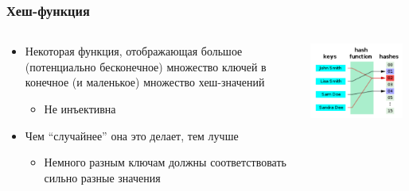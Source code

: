 \documentclass{../../slides-style}
\begin{document}
    \begin{frame}
        \frametitle{Хеш-функция}
        \begin{columns}
            \begin{column}{0.75\textwidth}
                \begin{itemize}
                    \item Некоторая функция, отображающая большое (потенциально бесконечное) множество ключей в конечное (и маленькое) множество хеш-значений
                    \begin{itemize}
                        \item Не инъективна
                    \end{itemize}
                    \item Чем ``случайнее'' она это делает, тем лучше
                    \begin{itemize}
                        \item Немного разным ключам должны соответствовать сильно разные значения
                    \end{itemize}
                \end{itemize}
            \end{column}
            \begin{column}{0.25\textwidth}
                \begin{center}
                    \includegraphics[width=0.95\textwidth]{hashfunction.png}
                \end{center}
            \end{column}
        \end{columns}

\end{frame}
\end{document}
